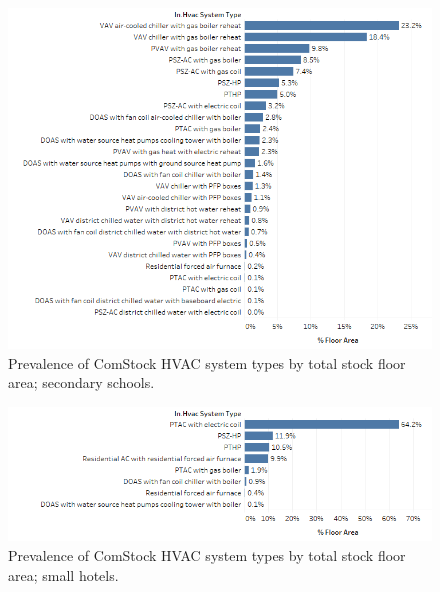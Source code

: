 \begin{figure}
    \centering \includegraphics[width=1.0\textwidth]{figures/HVAC_SYS_Type_PREV_Secondary_School.png}
    \caption[HVAC system type prevalence in secondary schools]{Prevalence of ComStock HVAC system types by total stock floor area; secondary schools.}
    \label{fig:hvac_sys_type_prevalence_secondary_school}
\end{figure}

\begin{figure}
    \centering \includegraphics[width=1.0\textwidth]{figures/HVAC_SYS_Type_PREV_Small_Hotel.png}
    \caption[HVAC system type prevalence in small hotels]{Prevalence of ComStock HVAC system types by total stock floor area; small hotels.}
    \label{fig:hvac_sys_type_prevalence_small_hotel}
\end{figure}


